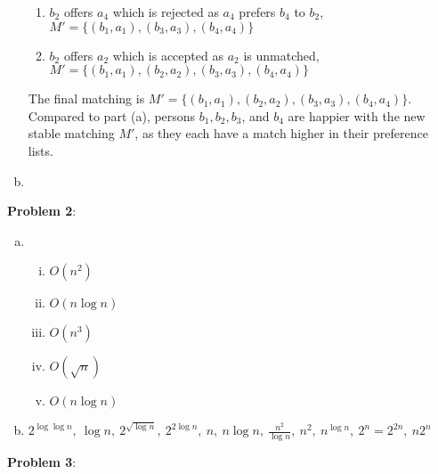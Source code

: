 \documentclass{article}
\begin{document}
\begin{enumerate}[a)]
\begin{enumerate}[1.]
        \item $b_2$ offers $a_4$ which is rejected as $a_4$ prefers $b_4$ to $b_2$, $M' = \{(b_1, a_1), (b_3, a_3), (b_4, a_4)\}$
        \item $b_2$ offers $a_2$ which is accepted as $a_2$ is unmatched, $M' = \{(b_1, a_1), (b_2, a_2), (b_3, a_3), (b_4, a_4)\}$
    \end{enumerate}
    The final matching is $M' = \{(b_1, a_1), (b_2, a_2), (b_3, a_3), (b_4, a_4)\}$. Compared to part (a), persons $b_1, b_2, b_3$, and $b_4$ are happier with the new stable matching $M'$, as they each have a match higher in their preference lists. 
    \item
\end{enumerate}
\textbf{Problem 2}:
\begin{enumerate}[a)]
    \item 
    \begin{enumerate}[(i)]
        \item $O(n^2)$
        \item $O(n \log n)$
        \item $O(n^3)$
        \item $O(\sqrt{n})$
        \item $O(n \log n)$
    \end{enumerate}
    \item $2^{\log \log n},\ \log n,\ 2^{\sqrt{\log n}},\ 2^{2 \log n},\ n,\ n \log n,\ \frac{n^2}{\log n},\ n^2,\ n^{\log n},\ 2^n = 2^{2n},\ n2^n$
\end{enumerate}
\textbf{Problem 3}:
\end{document}
